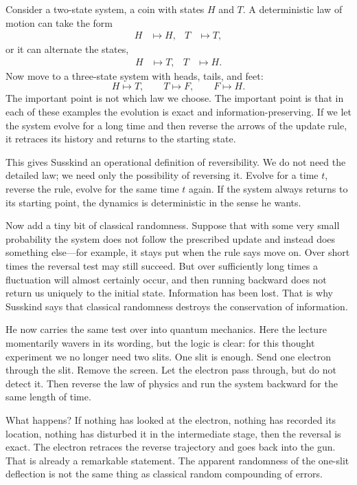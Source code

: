 Consider a two-state system, a coin with states \(H\) and \(T\). A deterministic law of motion can take the form
\begin{align}
H &\mapsto H, & T &\mapsto T,
\end{align}
or it can alternate the states,
\begin{align}
H &\mapsto T, & T &\mapsto H.
\end{align}
Now move to a three-state system with heads, tails, and feet:
\begin{equation}
H \mapsto T,\qquad T \mapsto F,\qquad F \mapsto H.
\end{equation}
The important point is not which law we choose. The important point is that in each of these examples the evolution is exact and information-preserving. If we let the system evolve for a long time and then reverse the arrows of the update rule, it retraces its history and returns to the starting state.

This gives Susskind an operational definition of reversibility. We do not need the detailed law; we need only the possibility of reversing it. Evolve for a time \(t\), reverse the rule, evolve for the same time \(t\) again. If the system always returns to its starting point, the dynamics is deterministic in the sense he wants.

Now add a tiny bit of classical randomness. Suppose that with some very small probability the system does not follow the prescribed update and instead does something else---for example, it stays put when the rule says move on. Over short times the reversal test may still succeed. But over sufficiently long times a fluctuation will almost certainly occur, and then running backward does not return us uniquely to the initial state. Information has been lost. That is why Susskind says that classical randomness destroys the conservation of information.

He now carries the same test over into quantum mechanics. Here the lecture momentarily wavers in its wording, but the logic is clear: for this thought experiment we no longer need two slits. One slit is enough. Send one electron through the slit. Remove the screen. Let the electron pass through, but do not detect it. Then reverse the law of physics and run the system backward for the same length of time.

What happens? If nothing has looked at the electron, nothing has recorded its location, nothing has disturbed it in the intermediate stage, then the reversal is exact. The electron retraces the reverse trajectory and goes back into the gun. That is already a remarkable statement. The apparent randomness of the one-slit deflection is not the same thing as classical random compounding of errors.


